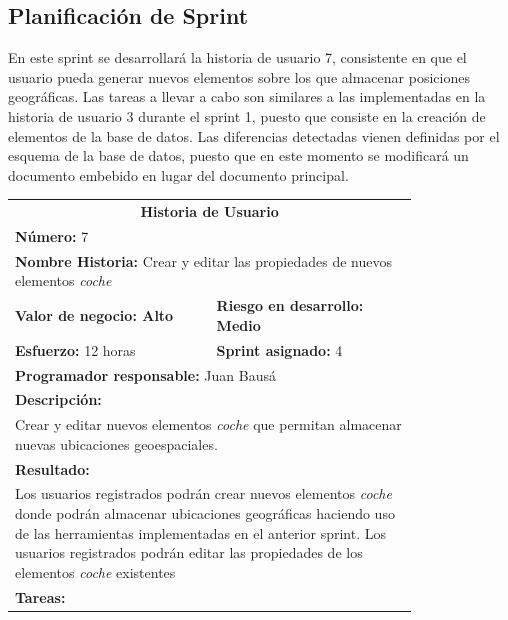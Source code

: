 	\subsection{Planificación de Sprint}
	En este sprint se desarrollará la historia de usuario 7, consistente en que el usuario pueda generar nuevos elementos sobre los que almacenar posiciones geográficas. Las tareas a llevar a cabo son similares a las implementadas en la historia de usuario 3 durante el sprint 1, puesto que consiste en la creación de elementos de la base de datos. Las diferencias detectadas vienen definidas por el esquema de la base de datos, puesto que en este momento se modificará un documento embebido en lugar del documento principal.
	
	\begin{table}[H]
	  \centering 
	 	\begin{tabular}{p{0.4\linewidth}p{0.4\linewidth}}
	    \toprule
	    \multicolumn{2}{c}{\cellcolor{black!30}\textbf{Historia de Usuario}} 													\\
		\multicolumn{2}{l}{\cellcolor{gray!25}\textbf{Número: }7}																\\
		\multicolumn{2}{l}{\textbf{Nombre Historia: } Crear y editar las propiedades de nuevos elementos \textit{coche}}				\\
		\cellcolor{gray!25}\textbf{Valor de negocio: Alto}	&	\cellcolor{gray!25}\textbf{Riesgo en desarrollo: Medio}		\\
		\textbf{Esfuerzo:} 12 horas				&	\textbf{Sprint asignado: }4												\\
		\multicolumn{2}{l}{\cellcolor{gray!25}\textbf{Programador responsable: }Juan Bausá}									\\
		\multicolumn{2}{l}{\textbf{Descripción:}}                                                     						\\
		\multicolumn{2}{l}{\parbox{15cm}{Crear y editar nuevos elementos \textit{coche} que permitan almacenar nuevas ubicaciones geoespaciales.}}				\\
		\multicolumn{2}{l}{\cellcolor{gray!25}\textbf{Resultado:}}																\\		
		\multicolumn{2}{l}{\parbox{15cm}{Los usuarios registrados podrán crear nuevos elementos \textit{coche} donde podrán almacenar ubicaciones geográficas haciendo uso de las herramientas implementadas en el anterior sprint. Los usuarios registrados podrán editar las propiedades de los elementos \textit{coche} existentes}}.																	\\
		\multicolumn{2}{l}{\textbf{Tareas:}}																					\\

\end{tabular}
\end{table}
